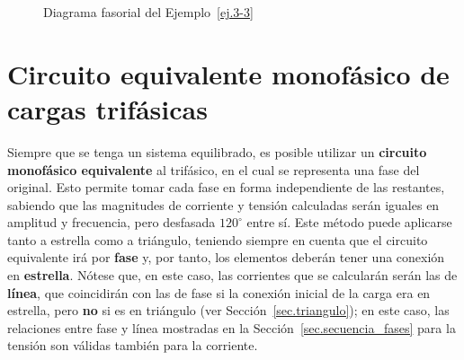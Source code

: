 \begin{example}
\begin{figure}[H]
	        \caption{Diagrama fasorial del Ejemplo~\ref{ej.3-3}}
	       \label{fig.diagrama_ejemplo_3-3}
	    \end{figure}
	\end{example}
	
	\section{Circuito equivalente monofásico de cargas trifásicas}\label{sec.c_eq_mon}
	 Siempre que se tenga un sistema equilibrado, es posible utilizar un \textbf{circuito monofásico equivalente} al trifásico, en el cual se representa una fase del original. Esto permite tomar cada fase en forma independiente de las restantes, sabiendo que las magnitudes de corriente y tensión calculadas serán iguales en amplitud y frecuencia, pero desfasada $120^\circ$ entre sí. Este método puede aplicarse tanto a estrella como a triángulo, teniendo siempre en cuenta que el circuito equivalente irá por \textbf{fase} y, por tanto, los elementos deberán tener una conexión en \textbf{estrella}. Nótese que, en este caso, las corrientes que se calcularán serán las de \textbf{línea}, que coincidirán con las de fase si la conexión inicial de la carga era en estrella, pero \textbf{no} si es en triángulo (ver Sección~\ref{sec.triangulo}); en este caso, las relaciones entre fase y línea mostradas en la Sección~\ref{sec.secuencia_fases} para la tensión son válidas también para la corriente.
	 
